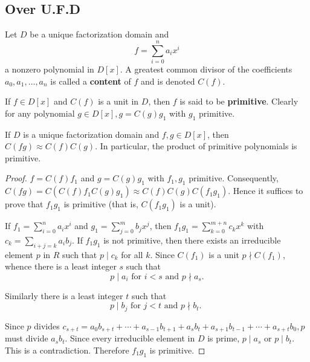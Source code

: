 \subsection{Over U.F.D}  %
\begin{definition}
    Let $D$ be a unique factorization domain and
    \begin{equation*}
        f
        =
        \sum_{i=0}^n a_i x^i
    \end{equation*}
    a nonzero polynomial in $D[x]$. A greatest common divisor of the coefficients $a_0, a_1, \ldots, a_n$ is called a \textbf{content} of $f$ and is denoted $C(f)$.

    If $f \in D[x]$ and $C(f)$ is a unit in $D$, then $f$ is said to be \textbf{primitive}. Clearly for any polynomial $g \in D[x], g=C(g) g_1$ with $g_1$ primitive.
\end{definition}


\begin{theorem}[Gauss]
    \label{lem: Gauss's lemma}
    If $D$ is a unique factorization domain and $ {f},  {g} \in  D[ {x}]$, then $ C( fg) \approx  C( {f})  C( {g})$.
    In particular, the product of primitive polynomials is primitive.

    \begin{proof}
        $f=C(f) f_1$ and $g=C(g) g_1$ with $f_1, g_1$ primitive. Consequently, $C(f g)=C\left(C(f) f_1 C(g) g_1\right) \approx C(f) C(g) C\left(f_1 g_1\right)$. Hence it suffices to prove that $f_1 g_1$ is primitive (that is, $C\left(f_1 g_1\right)$ is a unit).

        If $f_1=\sum_{i=0}^n a_i x^i$ and $g_1=\sum_{j=0}^m b_j x^j$, then $f_1 g_1=\sum_{k=0}^{m+n} c_k x^k$ with $c_k=\sum_{i+j=k} a_i b_j$. If $f_1 g_1$ is not primitive, then there exists an irreducible element $p$ in $R$ such that $p \mid c_k$ for all $k$. Since $C\left(f_1\right)$ is a unit $p \nmid C\left(f_1\right)$, whence there is a least integer $s$ such that
        \begin{equation*}
            p \mid a_i \text { for } i<s \text { and } p \nmid a_s .
        \end{equation*}

        Similarly there is a least integer $t$ such that
        \begin{equation*}
            p \mid b_j \text { for } j<t \text { and } p \nmid b_t \text {. }
        \end{equation*}

        Since $p$ divides $c_{s+t}=a_0 b_{s+t}+\cdots+a_{s-1} b_{t+1}+a_s b_t+a_{s+1} b_{t-1}+\cdots+a_{s+t} b_0, p$ must divide $a_s b_t$. Since every irreducible element in $D$ is prime, $p \mid a_s$ or $p \mid b_t$. This is a contradiction. Therefore $f_1 g_1$ is primitive.
    \end{proof}
\end{theorem}


